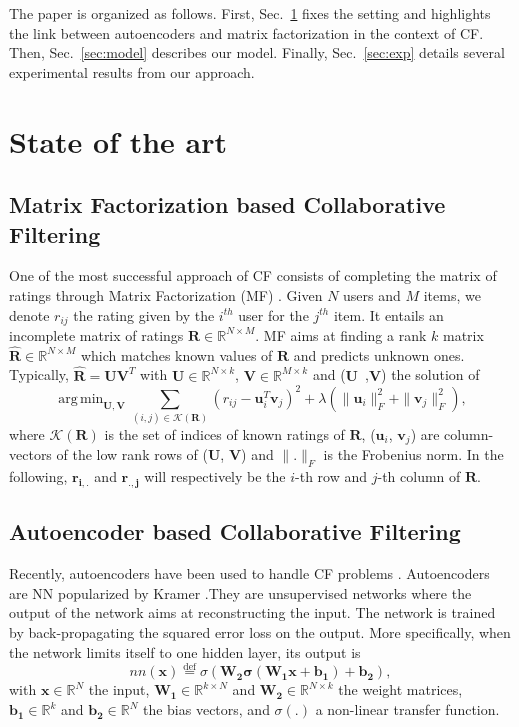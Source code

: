 \documentclass{article}
\newcommand{\mtx}[1]{\ensuremath{\mathbf{#1}}}
\newcommand{\usparse}{\mtx{r_{i,.}}}
\newcommand{\vsparse}{\mtx{r_{.,j}}}
\DeclareMathOperator*{\argmin}{arg\,min}
\begin{document}
The paper is organized as follows. First, Sec.~\ref{sec:preliminaries} fixes the setting and highlights the link between autoencoders and matrix factorization in the context of CF. Then, Sec.~\ref{sec:model} describes our model. Finally, Sec.~\ref{sec:exp} details several experimental results from our approach.

\section{State of the art}
\label{sec:preliminaries}

\subsection{Matrix Factorization based Collaborative Filtering}
One of the most successful approach of CF consists of completing the matrix of ratings through Matrix Factorization (MF) \cite{Koren2009}.
Given $N$ users and $M$ items, we denote $r_{ij}$ the rating given by the $i^{th}$  user for the $j^{th}$ item. 
It entails an incomplete matrix of ratings $\mtx{R} \in \mathbb{R}^{N\times M}$. 
MF aims at finding a rank $k$ matrix $\mtx{\widehat{R}} \in \mathbb{R}^{N\times M}$ which matches known values of $\mtx{R}$ and predicts unknown ones. Typically, $\mtx{\widehat{R}} = \mtx{U}\mtx{V}^{T}$ with $\mtx{U} \in \mathbb{R}^{N\times k}$, $\mtx{V} \in \mathbb{R}^{M\times k}$ and  ($\mtx{U}$~,$\mtx{V}$) the solution of
  $$\argmin_{\mtx{U},\mtx{V}}
  \sum_{(i,j) \in \mathcal{K}(\mtx{R}) }  (r_{ij} - \mtx{u}_i^T\mtx{v}_j)^2 + \lambda( \|\mtx{u}_i \|_{F}^2 + \|\mtx{v}_j \|_{F}^2),$$
where 
 $\mathcal{K}(\mtx{R})$ is the set of indices of known ratings of $\mtx{R}$,
 ($\mtx{u}_i$, $\mtx{v}_j$) are column-vectors of the low rank rows of ($\mtx{U}$, $\mtx{V}$) and 
 $\|.\|_{F}$ is the Frobenius norm.
In the following, $\usparse$ and $\vsparse$ will respectively be the $i$-th row  and $j$-th column of $\mtx{R}$.

\subsection{Autoencoder based Collaborative Filtering}

Recently, autoencoders have been used to handle CF problems \cite{Sedhain2015,Strub2015}.
Autoencoders are NN popularized by Kramer \cite{Kramer1991}.They are unsupervised networks where the output of the network aims at reconstructing the input.
The network is trained by back-propagating the squared error loss on the output.
More specifically, when the network limits itself to one hidden layer, its output is
$$ nn(\mtx{x}) \stackrel{\text{def}}{=} \sigma(\mtx{W_2 \sigma(\mtx{W_1 x + b_1}) + b_2}),$$
with $\mtx{x} \in \mathbb{R}^{N}$ the input, $\mtx{W_1} \in
\mathbb{R}^{k\times N}$ and $\mtx{W_2} \in \mathbb{R}^{N\times k}$ the weight
matrices, $\mtx{b_1} \in \mathbb{R}^{k}$ and $\mtx{b_2} \in \mathbb{R}^{N}$ the
bias vectors, and $\sigma(.)$ a non-linear transfer function.
\end{document}
